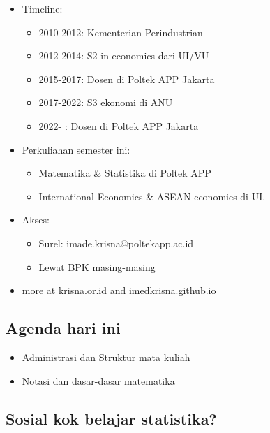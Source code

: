 \documentclass[
  letterpaper,
  DIV=11,
  numbers=noendperiod]{scrartcl}
\begin{document}
\begin{itemize}
\item
  Timeline:

  \begin{itemize}
  \item
    2010-2012: Kementerian Perindustrian
  \item
    2012-2014: S2 in economics dari UI/VU
  \item
    2015-2017: Dosen di Poltek APP Jakarta
  \item
    2017-2022: S3 ekonomi di ANU
  \item
    2022- : Dosen di Poltek APP Jakarta
  \end{itemize}
\item
  Perkuliahan semester ini:

  \begin{itemize}
  \item
    Matematika \& Statistika di Poltek APP
  \item
    International Economics \& ASEAN economies di UI.
  \end{itemize}
\item
  Akses:

  \begin{itemize}
  \item
    Surel: imade.krisna@poltekapp.ac.id
  \item
    Lewat BPK masing-masing
  \end{itemize}
\item
  more at \href{https://krisna.or.id}{krisna.or.id} and
  \href{https://imedkrisna.github.io/}{imedkrisna.github.io}
\end{itemize}

\hypertarget{agenda-hari-ini}{%
\subsection{Agenda hari ini}\label{agenda-hari-ini}}

\begin{itemize}
\item
  Administrasi dan Struktur mata kuliah
\item
  Notasi dan dasar-dasar matematika
\end{itemize}

\hypertarget{sosial-kok-belajar-statistika}{%
\subsection{Sosial kok belajar
statistika?}\label{sosial-kok-belajar-statistika}}
\end{document}
